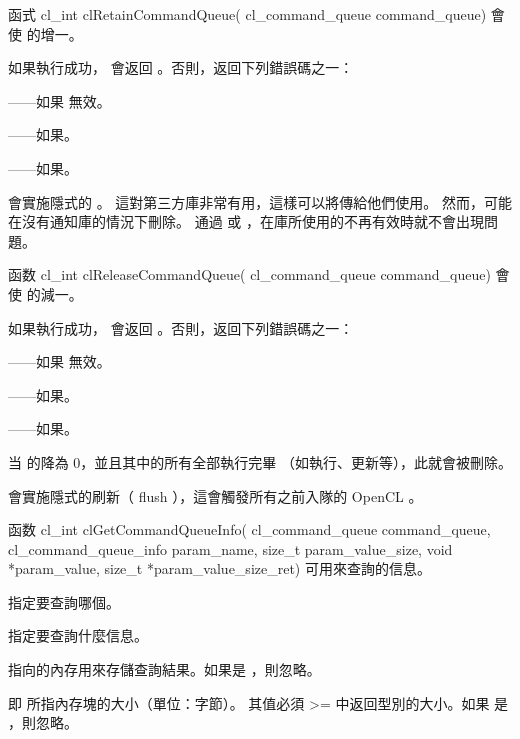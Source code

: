 函式
\startclc
cl_int clRetainCommandQueue(
		cl_command_queue command_queue)
\stopclc
會使  的增一。

如果執行成功， 會返回 。否則，返回下列錯誤碼之一：
\startigBase
\item {}——如果  無效。
\item {}——如果\scdevfailres。
\item {}——如果\schostfailres。
\stopigBase

 會實施隱式的 。
這對第三方庫非常有用，這樣可以將傳給他們使用。
然而，可能在沒有通知庫的情況下刪除。
通過  或  ，在庫所使用的不再有效時就不會出現問題。

函数
\startclc
cl_int clReleaseCommandQueue(
		cl_command_queue command_queue)
\stopclc
會使  的減一。

如果執行成功， 會返回 。否則，返回下列錯誤碼之一：
\startigBase
\item {}——如果  無效。
\item {}——如果\scdevfailres。
\item {}——如果\schostfailres。
\stopigBase

当  的降為 0，並且其中的所有全部執行完畢
（如執行、更新等），此就會被刪除。

會實施隱式的刷新（ flush ），這會觸發所有之前入隊的 OpenCL 。

函数
\startclc
cl_int clGetCommandQueueInfo(
		cl_command_queue command_queue,
		cl_command_queue_info param_name,
		size_t param_value_size,
		void *param_value,
		size_t *param_value_size_ret)
\stopclc
可用來查詢的信息。

 指定要查詢哪個。

 指定要查詢什麼信息。

 指向的內存用來存儲查詢結果。如果是 ，則忽略。

 即  所指內存塊的大小（單位：字節）。
其值必須 >= 中返回型別的大小。如果  是 ，則忽略。

